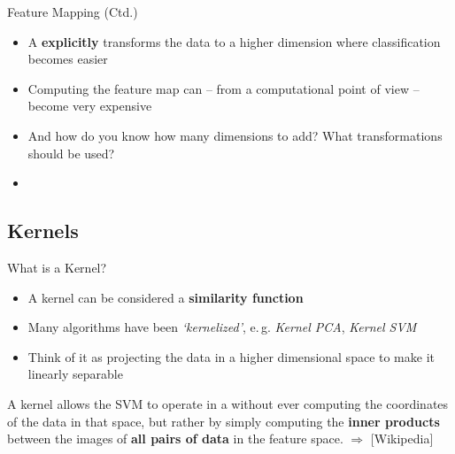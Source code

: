 \begin{frame}{Feature Mapping (Ctd.)}{}
	\begin{itemize}
		\item A  \textbf{explicitly} transforms the data to a higher dimension where classification becomes easier
		\item Computing the feature map can -- from a computational point of view -- become very expensive
		\item And how do you know how many dimensions to add? What transformations should be used?
		\item {}
	\end{itemize}
\end{frame}


\subsection{Kernels}

\begin{frame}{What is a Kernel?}{}
	\begin{itemize}
		\item A kernel can  be considered a \textbf{similarity function}
		\item Many algorithms have been \textit{`kernelized'}, e.\,g. \textit{Kernel PCA}, \textit{Kernel SVM}
		\item Think of it as projecting the data in a higher dimensional space to make it linearly separable
	\end{itemize}
	
	\begin{boxBlueNoFrame}
		\footnotesize
		A kernel allows the SVM to operate in a  without ever
		computing the coordinates of the data in that space, but rather by simply computing the \textbf{inner products}
		between the images of \textbf{all pairs of data} in the feature space. $\Rightarrow$  [Wikipedia]
	\end{boxBlueNoFrame}
\end{frame}


